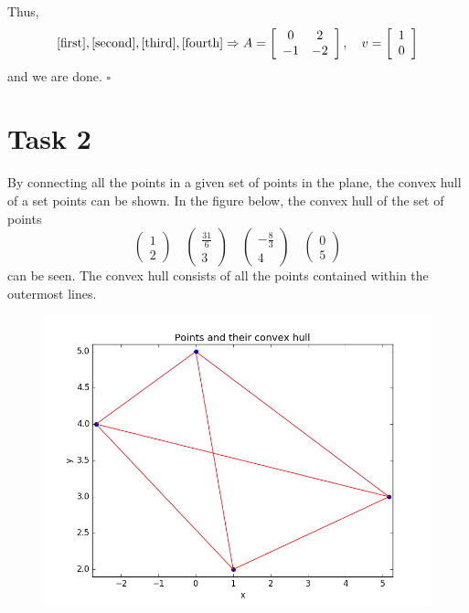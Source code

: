 \documentclass[]{article}
\begin{document}
Thus, \begin{equation*}
\eqref{first}, \eqref{second}, \eqref{third}, \eqref{fourth} \Rightarrow A=\left[\begin{array}{cc}
0&2\\
-1&-2
\end{array}\right], \quad v=\left[\begin{array}{c}
1\\
0
\end{array}\right]
\end{equation*}
and we are done. $\square$


\section*{Task 2}
By connecting all the points in a given set of points in the plane, the convex hull of a set points can be shown. In the figure below, the convex hull of the set of points \begin{equation*}
\left(\begin{array}{c}
1\\
2
\end{array}\right) \quad 
\left(\begin{array}{c}
\frac{31}{6}\\
3
\end{array}\right) \quad
\left(\begin{array}{r}
-\frac{8}{3}\\
4
\end{array}\right) \quad
\left(\begin{array}{c}
0\\
5
\end{array}\right)
\end{equation*}
can be seen. The convex hull consists of all the points contained within the outermost lines.
\begin{figure}[h!]
\includegraphics[scale=0.7]{convex_hull}
\end{figure}
\end{document}
